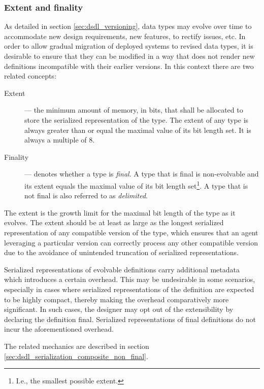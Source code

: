 \subsubsection{Extent and finality}\label{sec:dsdl_composite_extent_and_finality}

As detailed in section \ref{sec:dsdl_versioning},
data types may evolve over time to accommodate new design requirements, new features, to rectify issues, etc.
In order to allow gradual migration of deployed systems to revised data types,
it is desirable to ensure that they can be modified in a way that does not render new definitions
incompatible with their earlier versions.
In this context there are two related concepts:

\begin{description}
    \item[Extent] --- the minimum amount of memory, in bits, that shall be allocated to store the serialized
    representation of the type.
    The extent of any type is always greater than or equal the maximal value of its bit length set.
    It is always a multiple of 8.

    \item[Finality] --- denotes whether a type is \emph{final}.
    A type that is final is non-evolvable and its extent equals the maximal value of its bit length set\footnote{%
        I.e., the smallest possible extent.
    }.
    A type that is not final is also referred to as \emph{delimited}.
\end{description}

The extent is the growth limit for the maximal bit length of the type as it evolves.
The extent should be at least as large as the longest serialized representation of any compatible version of the type,
which ensures that an agent leveraging a particular version can correctly process any other compatible
version due to the avoidance of unintended truncation of serialized representations.

Serialized representations of evolvable definitions carry additional metadata which introduces a certain overhead.
This may be undesirable in some scenarios, especially in cases where serialized representations of the
definition are expected to be highly compact, thereby making the overhead comparatively more significant.
In such cases, the designer may opt out of the extensibility by declaring the definition final.
Serialized representations of final definitions do not incur the aforementioned overhead.

The related mechanics are described in section \ref{sec:dsdl_serialization_composite_non_final}.

